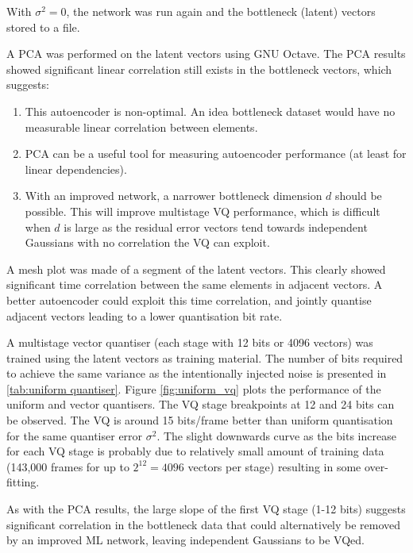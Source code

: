 \documentclass{article}
\begin{document}
With $\sigma^2=0$, the network was run again and the bottleneck (latent) vectors stored to a file.

A PCA was performed on the latent vectors using GNU Octave.  The PCA results showed significant linear correlation still exists in the bottleneck vectors, which suggests:
\begin{enumerate}
\item This autoencoder is non-optimal.  An idea bottleneck dataset would have no measurable linear correlation between elements.  
\item PCA can be a useful tool for measuring autoencoder performance (at least for linear dependencies).
\item With an improved network, a narrower bottleneck dimension $d$ should be possible.  This will improve multistage VQ performance, which is difficult when $d$ is large as the residual error vectors tend towards independent Gaussians with no correlation the VQ can exploit.
\end{enumerate}

A mesh plot was made of a segment of the latent vectors.  This clearly showed significant time correlation between the same elements in adjacent vectors.  A better autoencoder could exploit this time correlation, and jointly quantise adjacent vectors leading to a lower quantisation bit rate.

A multistage vector quantiser (each stage with 12 bits or 4096 vectors) was trained using the latent vectors as training material.  The number of bits required to achieve the same variance as the intentionally injected noise is presented in \ref{tab:uniform quantiser}.  Figure \ref{fig:uniform_vq} plots the performance of the uniform and vector quantisers.  The VQ stage breakpoints at 12 and 24 bits can be observed. The VQ is around 15 bits/frame better than uniform quantisation for the same quantiser error $\sigma^2$.  The slight downwards curve as the bits increase for each VQ stage is probably due to relatively small amount of training data (143,000 frames for up to $2^12=4096$ vectors per stage) resulting in some over-fitting. 

As with the PCA results, the large slope of the first VQ stage (1-12 bits) suggests significant correlation in the bottleneck data that could alternatively be removed by an improved ML network, leaving independent Gaussians to be VQed.
\end{document}
